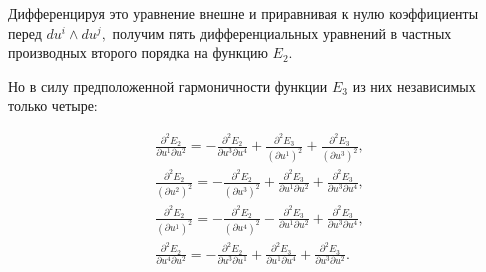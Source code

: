 Дифференцируя это уравнение внешне  и приравнивая к нулю коэффициенты перед $du^{i}\wedge du^{j},$ получим пять дифференциальных уравнений в частных  производных второго порядка на функцию $E_{2}.$ 

Но в силу  предположенной гармоничности функции $E_{3}$ из них независимых  только четыре:

\begin{equation}

\begin{array}{l}

\displaystyle

\frac{\partial ^{2}E_{2}}{\partial u^{1}\partial u^{2}}=-\frac{\partial

^{2}E_{2}}{\partial u^{3}\partial u^{4}}+\frac{\partial ^{2}E_{3}}{\left(

\partial u^{1}\right) ^{2}}+\frac{\partial ^{2}E_{3}}{\left( \partial

u^{3}\right) ^{2}},\\[2mm]

\displaystyle

\frac{\partial ^{2}E_{2}}{\left( \partial

u^{2}\right) ^{2}}=-\frac{\partial ^{2}E_{2}}{\left( \partial u^{3}\right)

^{2}}+\frac{\partial ^{2}E_{3}}{\partial u^{1}\partial u^{2}}+\frac{\partial

^{2}E_{3}}{\partial u^{3}\partial u^{4}}, \\[2mm]

\displaystyle

\frac{\partial ^{2}E_{2}}{\left( \partial u^{1}\right) ^{2}}=-\frac{\partial

^{2}E_{2}}{\left( \partial u^{4}\right) ^{2}}-\frac{\partial ^{2}E_{3}}{\partial u^{1}\partial u^{2}}+\frac{\partial ^{2}E_{3}}{\partial

u^{3}\partial u^{4}},\\[2mm]

\displaystyle

\frac{\partial ^{2}E_{2}}{\partial u^{4}\partial

u^{2}}=-\frac{\partial ^{2}E_{2}}{\partial u^{3}\partial u^{1}}+\frac{\partial ^{2}E_{3}}{\partial u^{1}\partial u^{4}}+\frac{\partial ^{2}E_{3}}{\partial u^{3}\partial u^{2}}.

\end{array}

\label{kriv:306}

\end{equation}



